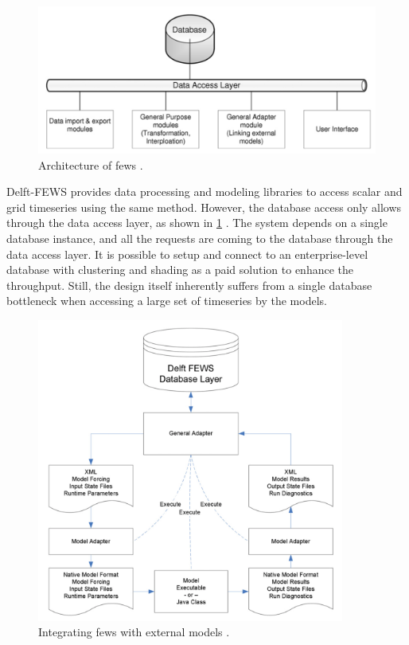 \begin{figure}[htp]
    \centering
    \includegraphics[width=1.0\textwidth]{lit/fews/Architecture-of-Delft-FEWS-showing-the-data-base-the-data-access-layers-and-examples-of_W640.png}
    \caption[Architecture of \acrshort{fews}]{Architecture of \acrshort{fews} \cite{Werner2013TheSystem}.}
    \label{fi:fews_data_layer}
\end{figure}

Delft-FEWS provides data processing and modeling libraries to access scalar and grid timeseries using the same method. However, the database access only allows through the data access layer, as shown in \cref{fi:fews_data_layer} \cite{Werner2013TheSystem}. The system depends on a single database instance, and all the requests are coming to the database through the data access layer. It is possible to setup and connect to an enterprise-level database with clustering and shading as a paid solution to enhance the throughput. Still, the design itself inherently suffers from a single database bottleneck when accessing a large set of timeseries by the models.

\begin{figure}[htp]
    \centering
    \includegraphics[width=0.9\textwidth]{lit/fews/Linking-Delft-FEWS-with-external-models-The-fi-gure-shows-the-fl-ow-of-data-through-XML_W640.png}
    \caption[\acrshort{fews} integration with external models]{Integrating \acrshort{fews} with external models \cite{Werner2013TheSystem}.}
    \label{fi:fews_general_adapter}
\end{figure}

